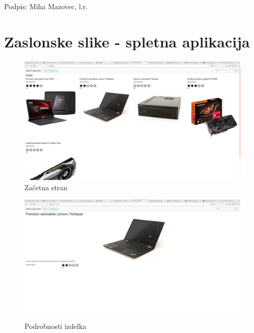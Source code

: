\documentclass[a4paper,12pt]{report}
\newcommand{\drugiavtor} {Miha Mazovec}
\begin{document}
Podpis: {\drugiavtor}, l.r.

\newpage


\chapter{Zaslonske slike - spletna aplikacija}

\begin{figure}[h]
    \centering
    \includegraphics[width=\linewidth]{slike/splet/first_page.png}
    \caption{Začetna stran}
    \label{fig:first_page}
\end{figure}

\begin{figure}[h]
    \centering
    \includegraphics[width=\linewidth]{slike/splet/product_detail.png}
    \caption{Podrobnosti izdelka}
    \label{fig:product_details}
\end{figure}
\end{document}
